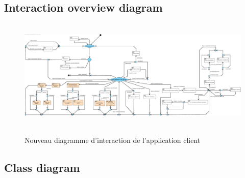 \documentclass[]{report}
\begin{document}


\newpage

\subsection{Interaction overview diagram}



\begin{figure}[h!]
\hspace{-3cm}
\hbox{
	\includegraphics[scale=0.5]{img/Interaction Overview Client - Extension 6.pdf}
}
\caption{Nouveau diagramme d'interaction de l'application client}
\end{figure}

\newpage

\subsection{Class diagram}


\end{document}
